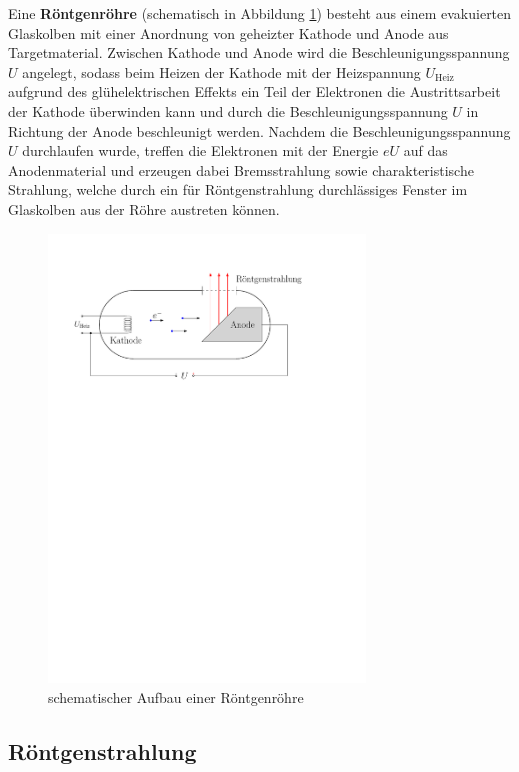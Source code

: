 \documentclass[11pt, a4paper]{article}
\numberwithin{equation}{section}
\begin{document}
Eine \textbf{Röntgenröhre} (schematisch in Abbildung \ref{fig:roehre}) besteht aus einem evakuierten Glaskolben mit einer Anordnung von geheizter Kathode und Anode aus Targetmaterial.
Zwischen Kathode und Anode wird die Beschleunigungsspannung $U$ angelegt, sodass beim Heizen der Kathode mit der Heizspannung $U_\mathrm{Heiz}$ aufgrund des glühelektrischen Effekts ein Teil der Elektronen die Austrittsarbeit der Kathode überwinden kann und durch die Beschleunigungsspannung $U$ in Richtung der Anode beschleunigt werden.
Nachdem die Beschleunigungsspannung $U$ durchlaufen wurde, treffen die Elektronen mit der Energie $e U$ auf das Anodenmaterial und erzeugen dabei Bremsstrahlung sowie charakteristische Strahlung, welche durch ein für Röntgenstrahlung durchlässiges Fenster im Glaskolben aus der Röhre austreten können.
\begin{figure}[ht]
	\centering
	\includegraphics[width=0.75\textwidth]{./figures/roentgenroehre.pdf}
	\caption{schematischer Aufbau einer Röntgenröhre}
	\label{fig:roehre}
\end{figure}

\subsection{Röntgenstrahlung}
\end{document}
